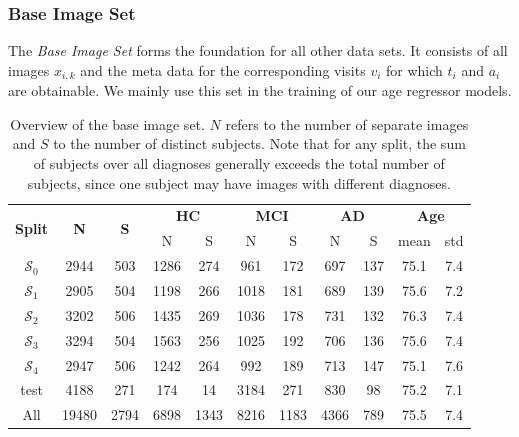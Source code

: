 \subsubsection*{Base Image Set} \label{sec:datsingles}
The \textit{Base Image Set} forms the foundation for all other data sets. It consists of all images $x_{i, k}$ and the meta data for the corresponding visits $v_i$ for which $t_i$ and $a_i$ are obtainable. We mainly use this set in the training of our age regressor models.

\begin{table}[h]
	\begin{center}
		\begin{tabular}{c c c c c c c c c c c}
			\toprule
			\multirow{2}{*}{\bfseries Split} & 
			\multirow{2}{*}{\bfseries N} & 
			\multirow{2}{*}{\bfseries S} & 
			\multicolumn{2}{c}{\bfseries HC} & 
			\multicolumn{2}{c}{\bfseries MCI} & 
			\multicolumn{2}{c}{\bfseries AD} &
			\multicolumn{2}{c}{\bfseries Age} \\
			\cmidrule(lr){4-5}
			\cmidrule(lr){6-7}
			\cmidrule(lr){8-9}
			\cmidrule(lr){10-11} 
			& & & N & S & N & S & N & S & mean & std \\ 
			\cmidrule(lr){1-11}
			$\mathcal{S}_0$ &  2944 &  503 & 1286 &  274 &  961 &  172 &  697 & 137 & 75.1 & 7.4 \\
			$\mathcal{S}_1$ &  2905 &  504 & 1198 &  266 & 1018 &  181 &  689 & 139 & 75.6 & 7.2 \\
			$\mathcal{S}_2$ &  3202 &  506 & 1435 &  269 & 1036 &  178 &  731 & 132 & 76.3 & 7.4 \\
			$\mathcal{S}_3$ &  3294 &  504 & 1563 &  256 & 1025 &  192 &  706 & 136 & 75.6 & 7.4 \\
			$\mathcal{S}_4$ &  2947 &  506 & 1242 &  264 &  992 &  189 &  713 & 147 & 75.1 & 7.6 \\
			test            &  4188 &  271 &  174 &   14 & 3184 &  271 &  830 &  98 & 75.2 & 7.1 \\
			\cmidrule(lr){1-11}
			All             & 19480 & 2794 & 6898 & 1343 & 8216 & 1183 & 4366 & 789 & 75.5 & 7.4 \\
			\bottomrule
		\end{tabular}
		\caption{Overview of the base image set. $N$ refers to the number of separate images and $S$ to the number of distinct subjects. Note that for any split, the sum of subjects over all diagnoses generally exceeds the total number of subjects, since one subject may have images with different diagnoses.}
		\label{tab:baseset}
	\end{center}
\end{table}

